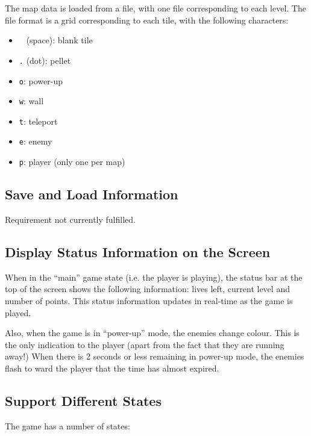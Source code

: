 \documentclass[a4paper,11pt]{article}
\begin{document}
    The map data is loaded from a file, with one file corresponding to each
    level. The file format is a grid corresponding to each tile, with the
    following characters:

    \begin{itemize}
        \item \verb! ! (space): blank tile
        \item \verb!.! (dot): pellet
        \item \verb!o!: power-up
        \item \verb!w!: wall
        \item \verb!t!: teleport
        \item \verb!e!: enemy
        \item \verb!p!: player (only one per map)
    \end{itemize}

    \subsection{Save and Load Information}

    Requirement not currently fulfilled.

    \subsection{Display Status Information on the Screen}

    When in the ``main'' game state (i.e. the player is playing), the status
    bar at the top of the screen shows the following information: lives left,
    current level and number of points. This status information updates in
    real-time as the game is played.

    Also, when the game is in ``power-up'' mode, the enemies change colour.
    This is the only indication to the player (apart from the fact that they
    are running away!) When there is 2 seconds or less remaining in power-up
    mode, the enemies flash to ward the player that the time has almost
    expired.

    \subsection{Support Different States}

    The game has a number of states:
\end{document}
